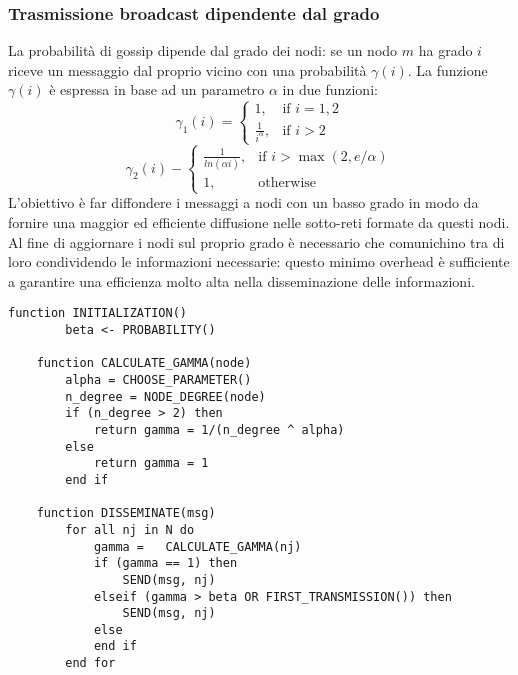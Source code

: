 \begin{appendices}
    \subsubsection{Trasmissione broadcast dipendente dal grado}
    La probabilità di gossip dipende dal grado dei nodi: se un nodo $m$ ha grado $i$ riceve un messaggio dal proprio vicino con una probabilità $\gamma(i)$. La funzione $\gamma(i)$ è espressa in base ad un parametro $\alpha$ in due funzioni:
    \begin{equation}
        \gamma_1(i) = \begin{cases} 1, & \mbox{if } i=1,2 \\ \frac{1}{i^{\alpha}}, & \mbox{if } i\gt2\end{cases}
    \end{equation}
    \begin{equation}
        \gamma_2(i) - \begin{cases} \frac{1}{ln(\alpha i)}, & \mbox{if } i\gt \max(2, e/\alpha) \\ 1, & \mbox{otherwise}\end{cases}
    \end{equation}
    L'obiettivo è far diffondere i messaggi a nodi con un basso grado in modo da fornire una maggior ed efficiente diffusione nelle sotto-reti formate da questi nodi. Al fine di aggiornare i nodi sul proprio grado è necessario che comunichino tra di loro condividendo le informazioni necessarie: questo minimo overhead è sufficiente a garantire una efficienza molto alta nella disseminazione delle informazioni.
    \begin{lstlisting}[caption=Pseudocodice dell'algoritmo di diffusione con a broadcast dipendente dal grado]
    function INITIALIZATION()
        beta <- PROBABILITY()
    
    function CALCULATE_GAMMA(node)
        alpha = CHOOSE_PARAMETER()
        n_degree = NODE_DEGREE(node)
        if (n_degree > 2) then
            return gamma = 1/(n_degree ^ alpha)
        else
            return gamma = 1
        end if
    
    function DISSEMINATE(msg)
        for all nj in N do
            gamma =   CALCULATE_GAMMA(nj)
            if (gamma == 1) then
                SEND(msg, nj)
            elseif (gamma > beta OR FIRST_TRANSMISSION()) then           
                SEND(msg, nj)
            else
            end if
        end for
    \end{lstlisting}
\end{appendices}

